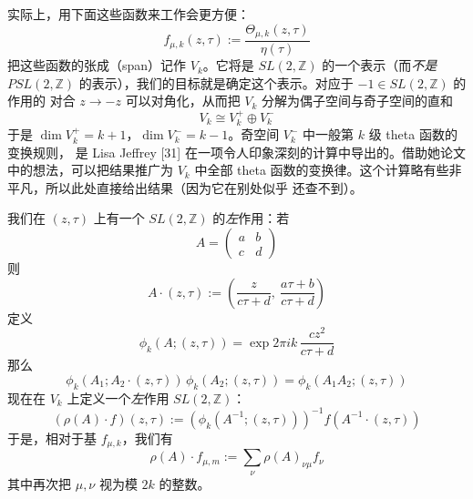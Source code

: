 实际上，用下面这些函数来工作会更方便：
\begin{equation}
  f_{\mu,k}(z,\tau) := \frac{\Theta_{\mu,k}(z,\tau)}{\eta(\tau)}
  \tag{D.3}
  \label{eq:D.3}
\end{equation}
把这些函数的张成（span）记作 $V_k$。它将是 $SL(2,\mathbb{Z})$ 的一个表示（而\emph{不是}
$PSL(2,\mathbb{Z})$ 的表示），我们的目标就是确定这个表示。对应于 $-1\in SL(2,\mathbb{Z})$ 的作用的
对合 $z\to -z$ 可以对角化，从而把 $V_k$ 分解为偶子空间与奇子空间的直和
\begin{equation}
  V_k\cong V_k^+\oplus V_k^-
  \tag{D.4}
  \label{eq:D.4}
\end{equation}
于是 $\dim V_k^+=k+1$，$\dim V_k^-=k-1$。奇空间 $V_k^-$ 中一般第 $k$ 级 theta 函数的变换规则，
是 Lisa Jeffrey [31] 在一项令人印象深刻的计算中导出的。借助她论文中的想法，可以把结果推广为
$V_k$ 中全部 theta 函数的变换律。这个计算略有些非平凡，所以此处直接给出结果（因为它在别处似乎
还查不到）。

我们在 $(z,\tau)$ 上有一个 $SL(2,\mathbb{Z})$ 的\emph{左}作用：若
\begin{equation}
  A = \begin{pmatrix} a & b\\ c & d\end{pmatrix}
  \tag{D.5}
  \label{eq:D.5}
\end{equation}
则
\begin{equation}
  A\cdot(z,\tau) := \left(\frac{z}{c\tau+d},\ \frac{a\tau+b}{c\tau+d}\right)
  \tag{D.6}
  \label{eq:D.6}
\end{equation}
定义
\begin{equation}
  \phi_k(A;(z,\tau)) = \exp 2\pi i k\,\frac{cz^2}{c\tau+d}
  \tag{D.7}
  \label{eq:D.7}
\end{equation}
那么
\begin{equation}
  \phi_k(A_1;A_2\cdot(z,\tau))\,\phi_k(A_2;(z,\tau)) = \phi_k(A_1A_2;(z,\tau))
  \tag{D.8}
  \label{eq:D.8}
\end{equation}
现在在 $V_k$ 上定义一个\emph{左}作用 $SL(2,\mathbb{Z})$：
\begin{equation}
  (\rho(A)\cdot f)(z,\tau) := \left(\phi_k(A^{-1};(z,\tau))\right)^{-1} f(A^{-1}\cdot(z,\tau))
  \tag{D.9}
  \label{eq:D.9}
\end{equation}
于是，相对于基 $f_{\mu,k}$，我们有
\begin{equation}
  \rho(A)\cdot f_{\mu,m} := \sum_{\nu}\rho(A)_{\nu\mu}f_{\nu}
  \tag{D.10}
  \label{eq:D.10}
\end{equation}
其中再次把 $\mu,\nu$ 视为模 $2k$ 的整数。

